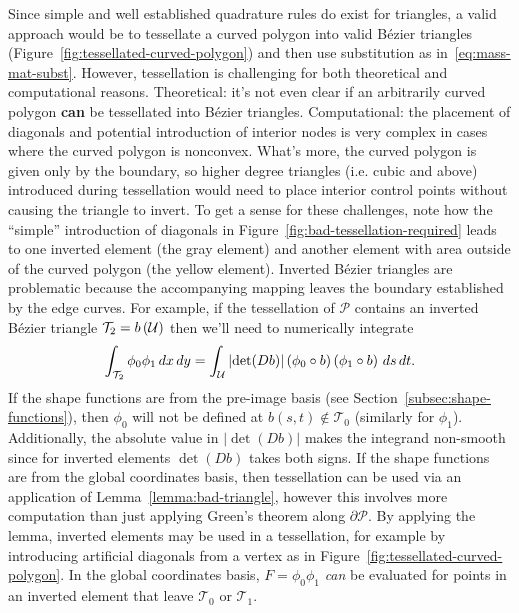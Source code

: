 Since simple and well established quadrature rules do exist for triangles,
a valid approach would be
to tessellate a curved polygon into valid B\'{e}zier triangles
(Figure~\ref{fig:tessellated-curved-polygon}) and then use substitution as
in~\eqref{eq:mass-mat-subst}. However, tessellation is challenging for both
theoretical and computational reasons.
Theoretical: it's not even clear if an arbitrarily curved polygon \textbf{can}
be tessellated into B\'{e}zier triangles. Computational: the placement
of diagonals and potential introduction of interior nodes is very
complex in cases where the curved polygon is nonconvex. What's more,
the curved polygon is given only by the boundary, so higher degree triangles
(i.e. cubic and above) introduced during tessellation would need to place
interior control points without causing the triangle to invert. To get a
sense for these challenges, note how the ``simple'' introduction of
diagonals in Figure~\ref{fig:bad-tessellation-required} leads to one
inverted element (the gray element) and another element with area outside
of the curved polygon (the yellow element). Inverted B\'{e}zier triangles
are problematic because the accompanying mapping leaves the boundary
established by the edge curves. For example,
if the tessellation of \(\mathcal{P}\) contains an inverted
B\'{e}zier triangle \(\mathcal{T}_2 = b\left(\mathcal{U}\right)\) then we'll
need to numerically integrate
\begin{equation}
\int_{\mathcal{T}_2} \phi_0 \phi_1 \, dx \, dy =
  \int_{\mathcal{U}} \left|\det(Db)\right| \left(\phi_0 \circ b\right)
  \left(\phi_1 \circ b\right) \, ds \, dt.
\end{equation}
If the shape functions are from the pre-image basis (see
Section~\ref{subsec:shape-functions}), then \(\phi_0\)
will not be defined at \(b(s, t) \not\in \mathcal{T}_0\) (similarly for
\(\phi_1\)). Additionally, the absolute value in \(\left|\det(Db)\right|\)
makes the integrand non-smooth since for inverted elements
\(\det(Db)\) takes both signs. If the shape functions are from the
global coordinates basis, then tessellation can be used via an
application of Lemma~\ref{lemma:bad-triangle}, however this involves
more computation than just applying Green's theorem along
\(\partial \mathcal{P}\). By applying the lemma, inverted elements may
be used in a tessellation, for example by introducing artificial
diagonals from a vertex as in Figure~\ref{fig:tessellated-curved-polygon}.
In the global coordinates basis, \(F = \phi_0 \phi_1\) \textit{can}
be evaluated for points in an inverted element that leave
\(\mathcal{T}_0\) or \(\mathcal{T}_1\).

